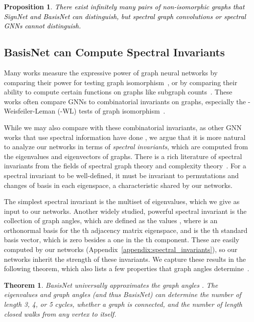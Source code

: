 \documentclass{article} \usepackage{iclr2023_conference,times}
\newtheorem{theorem}{Theorem}
\newtheorem{proposition}{Proposition}
\newcommand{\rebut}[1]{\textcolor{black}{#1}}
\begin{document}
\begin{proposition}\label{prop:signnet_strictly_greater_conv}
\rebut{There exist infinitely many pairs of non-isomorphic graphs that SignNet and BasisNet can distinguish, but spectral graph convolutions or spectral GNNs cannot distinguish.}
\end{proposition}


\subsection{BasisNet can Compute Spectral Invariants}

Many works measure the expressive power of graph neural networks by comparing their power for testing graph isomorphism~\citep{xu2018powerful, sato2020survey}, or by comparing their ability to compute certain functions on graphs like subgraph counts~\citep{chen2020can, tahmasebi2020counting}. These works often compare GNNs to combinatorial invariants on graphs, especially the -Weisfeiler-Leman (-WL) tests of graph isomorphism~\citep{morris2021weisfeiler}.

While we may also compare with these combinatorial invariants, as other GNN works that use spectral information have done \citep{beaini2021directional}, we argue that it is more natural to analyze our networks in terms of \textit{spectral invariants}, which are computed from the eigenvalues and eigenvectors of graphs. There is a rich literature of spectral invariants from the fields of spectral graph theory and complexity theory~\citep{cvetkovic1997eigenspaces}. For a spectral invariant to be well-defined, it must be invariant to permutations and changes of basis in each eigenspace, a  characteristic shared by our networks.

The simplest spectral invariant is the multiset of eigenvalues, which we give as input to our networks. Another widely studied, powerful spectral invariant is the collection of graph angles, which are defined as the values , where  is an orthonormal basis for the th adjacency matrix eigenspace, and  is the th standard basis vector, which is zero besides a one in the th component. These are easily computed by our networks (Appendix~\ref{appendix:spectral_invariants}), so our networks inherit the strength of these invariants. We capture these results in the following theorem, which also lists a few properties that graph angles determine~\citep{cvetkovic1991some}. 

\begin{theorem}\label{prop:graph_angles}
    BasisNet universally approximates the graph angles . The eigenvalues and graph angles (and thus BasisNet) can determine the number of length 3, 4, or 5 cycles, whether a graph is connected, and the number of length  closed walks from any vertex to itself.
\end{theorem}
\end{document}
